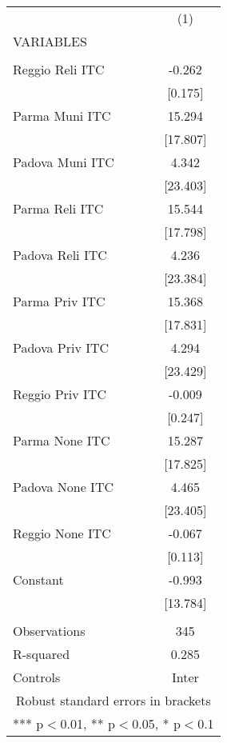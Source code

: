 \begin{tabular}{lc} \hline
 & (1) \\
VARIABLES &  \\ \hline
 &  \\
Reggio Reli ITC & -0.262 \\
 & [0.175] \\
Parma Muni ITC & 15.294 \\
 & [17.807] \\
Padova Muni ITC & 4.342 \\
 & [23.403] \\
Parma Reli ITC & 15.544 \\
 & [17.798] \\
Padova Reli ITC & 4.236 \\
 & [23.384] \\
Parma Priv ITC & 15.368 \\
 & [17.831] \\
Padova Priv ITC & 4.294 \\
 & [23.429] \\
Reggio Priv ITC & -0.009 \\
 & [0.247] \\
Parma None ITC & 15.287 \\
 & [17.825] \\
Padova None ITC & 4.465 \\
 & [23.405] \\
Reggio None ITC & -0.067 \\
 & [0.113] \\
Constant & -0.993 \\
 & [13.784] \\
 &  \\
Observations & 345 \\
R-squared & 0.285 \\
 Controls & Inter \\ \hline
\multicolumn{2}{c}{ Robust standard errors in brackets} \\
\multicolumn{2}{c}{ *** p$<$0.01, ** p$<$0.05, * p$<$0.1} \\
\end{tabular}
